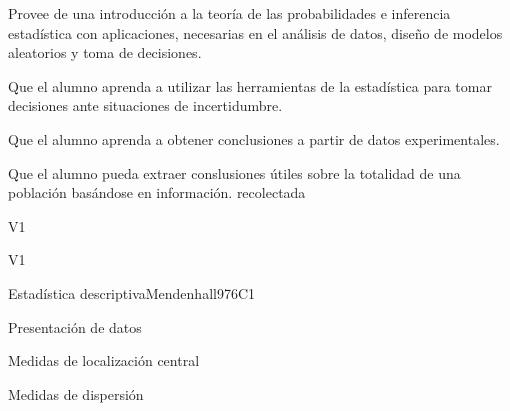 
\begin{syllabus}


\begin{justification}
Provee de una introducción a la teoría de las probabilidades e inferencia estadística con aplicaciones, necesarias en el análisis de datos, diseño de modelos aleatorios y toma de decisiones.
\end{justification}

\begin{goals}
\item Que el alumno aprenda a utilizar las herramientas de la estadística para tomar decisiones ante situaciones de incertidumbre.
\item Que el alumno aprenda a obtener conclusiones a partir de datos experimentales.
\item Que el alumno pueda extraer conslusiones útiles sobre la totalidad de una población basándose en información. recolectada
\end{goals}

\begin{outcomes}{V1}
   \item {}
   \item {}
   \item {}
\end{outcomes}

\begin{competences}{V1}
    \item {} 
    \item {}
    \item {}
\end{competences}


\begin{unit}{}{Estadística descriptiva}{Mendenhall97}{6}{C1}
\begin{topics}
      \item Presentación de datos
      \item Medidas de localización central
      \item Medidas de dispersión
   \end{topics}


\end{unit}
\end{syllabus}
